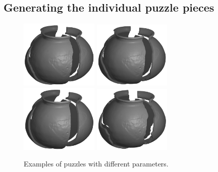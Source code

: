 \documentclass[acmlarge,screen,dvipsnames]{acmart}
\begin{document}
\subsection{Generating the individual puzzle pieces}
\label{sec:fragment-generation}


\begin{figure}[H]    
     \centering
         {\includegraphics[width=0.33\textwidth]{images/pott1}}
        {\includegraphics[width=0.33\textwidth]{images/pott2}}
        {\includegraphics[width=0.33\textwidth]{images/pott3}}
        {\includegraphics[width=0.33\textwidth]{images/pott5}}
      \caption{\label{fig:pot-with-different-fracture-settings}%
        Examples of puzzles with different parameters.}
\end{figure}
\end{document}
